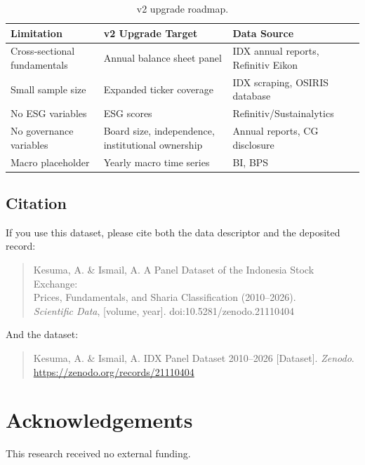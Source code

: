 \documentclass[11pt,a4paper]{article}
\begin{document}
\begin{table}[H]
\centering
\caption{v2 upgrade roadmap.}
\label{tab:roadmap}
\begin{tabular}{l p{4.5cm} p{4.5cm}}
\toprule
\textbf{Limitation} & \textbf{v2 Upgrade Target} & \textbf{Data Source} \\
\midrule
Cross-sectional fundamentals & Annual balance sheet panel & IDX annual reports, Refinitiv Eikon \\
Small sample size            & Expanded ticker coverage   & IDX scraping, OSIRIS database \\
No ESG variables             & ESG scores                 & Refinitiv/Sustainalytics \\
No governance variables      & Board size, independence, institutional ownership & Annual reports, CG disclosure \\
Macro placeholder            & Yearly macro time series   & BI, BPS \\
\bottomrule
\end{tabular}
\end{table}

\subsection{Citation}

If you use this dataset, please cite both the data descriptor and the deposited record:

\begin{quote}
Kesuma, A. \& Ismail, A. A Panel Dataset of the Indonesia Stock Exchange:\\ Prices, Fundamentals, and Sharia Classification (2010--2026).\\ \textit{Scientific Data}, [volume, year]. doi:10.5281/zenodo.21110404
\end{quote}

And the dataset:

\begin{quote}
Kesuma, A. \& Ismail, A. IDX Panel Dataset 2010--2026 [Dataset]. \textit{Zenodo}. \url{https://zenodo.org/records/21110404}
\end{quote}

\section*{Acknowledgements}

This research received no external funding.
\end{document}
